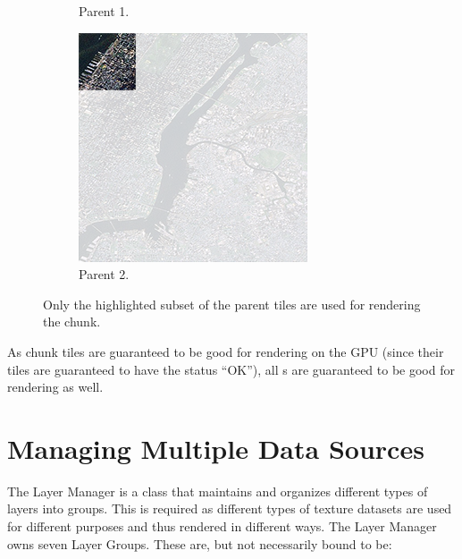 \begin{figure}[htbp]
\begin{subfigure}[t]{0.3\textwidth}
        \caption{Parent 1.}
    \end{subfigure}
    \quad
    \begin{subfigure}[t]{0.3\textwidth}
        \includegraphics[width=\textwidth]{figures/implementation/chunktile/chunktilepile1.png}
        \caption{Parent 2.}
    \end{subfigure}
    \caption{Only the highlighted subset of the parent tiles are used for rendering the chunk.}
    \label{fig:chunktilepile}
\end{figure}

As chunk tiles are guaranteed to be good for rendering on the GPU (since their tiles are guaranteed to have the status ``OK''), all s are guaranteed to be good for rendering as well. 

\section{Managing Multiple Data Sources}

The Layer Manager is a class that maintains and organizes different types of layers into groups. This is required as different types of texture datasets are used for different purposes and thus rendered in different ways. The Layer Manager owns seven Layer Groups. These are, but not necessarily bound to be:


